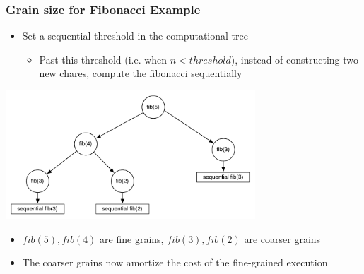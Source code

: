 

\begin{frame}[fragile]
  \frametitle{Grain size for Fibonacci Example}
  \begin{itemize}
  \item Set a sequential threshold in the computational tree
    \begin{itemize}
    \item Past this threshold (i.e. when $n < threshold$), instead of
      constructing two new chares, compute the fibonacci sequentially
    \end{itemize}
  \end{itemize}
  \begin{center} \includegraphics[width=0.7\textwidth]{figures/tree-threshold.pdf} \end{center}
  \begin{itemize}
    \item $fib(5), fib(4)$ are fine grains, $fib(3), fib(2)$ are coarser grains
    \item The coarser grains now amortize the cost of the fine-grained execution
  \end{itemize}
\end{frame}

%   
